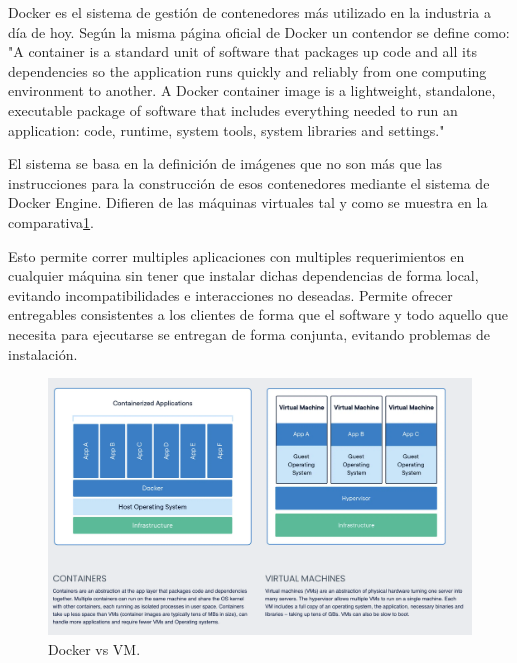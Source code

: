 
Docker es el sistema de gestión de contenedores más utilizado en la industria a día de hoy. Según la misma página oficial de Docker un contendor se define como: "A container is a standard unit of software that packages up code and all its dependencies so the application runs quickly and reliably from one computing environment to another. A Docker container image is a lightweight, standalone, executable package of software that includes everything needed to run an application: code, runtime, system tools, system libraries and settings." \cite{docker}

El sistema se basa en la definición de imágenes que no son más que las instrucciones para la construcción de esos contenedores mediante el sistema de Docker Engine. Difieren de las máquinas virtuales tal y como se muestra en la comparativa\ref{fig:Docker vs VM}.

Esto permite correr multiples aplicaciones con multiples requerimientos en cualquier máquina sin tener que instalar dichas dependencias de forma local, evitando incompatibilidades e interacciones no deseadas. Permite ofrecer entregables consistentes a los clientes de forma que el software y todo aquello que necesita para ejecutarse se entregan de forma conjunta, evitando problemas de instalación.

\begin{figure}[H]
    \centering
    \includegraphics[height=0.3\textheight]{./part/Proyecto_ejecutivo/memoria_constructiva/docker/img/dockerVsVM}
    \caption{Docker vs VM.\cite{docker}}\label{fig:Docker vs VM}
\end{figure}

